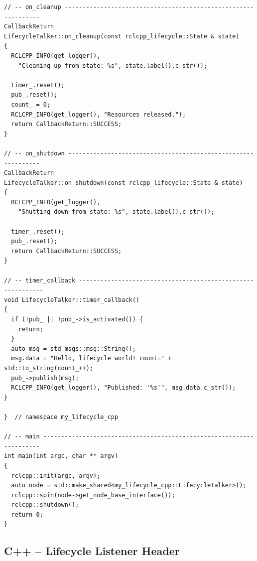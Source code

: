 \documentclass[11pt,a4paper]{csarticle}
\begin{document}
\begin{lstlisting}[style=cpp,caption={src/lifecycle\_talker.cpp}]
// -- on_cleanup ---------------------------------------------------------------
CallbackReturn
LifecycleTalker::on_cleanup(const rclcpp_lifecycle::State & state)
{
  RCLCPP_INFO(get_logger(),
    "Cleaning up from state: %s", state.label().c_str());

  timer_.reset();
  pub_.reset();
  count_ = 0;
  RCLCPP_INFO(get_logger(), "Resources released.");
  return CallbackReturn::SUCCESS;
}

// -- on_shutdown --------------------------------------------------------------
CallbackReturn
LifecycleTalker::on_shutdown(const rclcpp_lifecycle::State & state)
{
  RCLCPP_INFO(get_logger(),
    "Shutting down from state: %s", state.label().c_str());

  timer_.reset();
  pub_.reset();
  return CallbackReturn::SUCCESS;
}

// -- timer_callback ------------------------------------------------------------
void LifecycleTalker::timer_callback()
{
  if (!pub_ || !pub_->is_activated()) {
    return;
  }
  auto msg = std_msgs::msg::String();
  msg.data = "Hello, lifecycle world! count=" + std::to_string(count_++);
  pub_->publish(msg);
  RCLCPP_INFO(get_logger(), "Published: '%s'", msg.data.c_str());
}

}  // namespace my_lifecycle_cpp

// -- main ---------------------------------------------------------------------
int main(int argc, char ** argv)
{
  rclcpp::init(argc, argv);
  auto node = std::make_shared<my_lifecycle_cpp::LifecycleTalker>();
  rclcpp::spin(node->get_node_base_interface());
  rclcpp::shutdown();
  return 0;
}
\end{lstlisting}

\subsection{C++ -- Lifecycle Listener Header}
\end{document}
